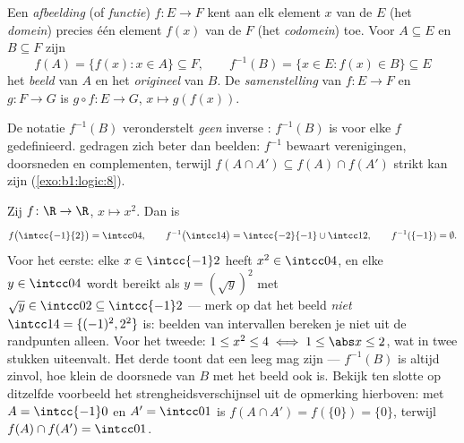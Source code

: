 \begin{definition}\label{def:b1:logic:map}
Een \emph{afbeelding} (of \emph{functie}) $f \colon E
\to F$ kent aan elk element $x$ van de  $E$ (het
\emph{domein}) precies één element $f(x)$ van de  $F$ (het
\emph{codomein}) toe. Voor $A \subseteq E$ en $B \subseteq F$ zijn
\[
f(A) = \{f(x) : x \in A\} \subseteq F,
\qquad
f^{-1}(B) = \{x \in E : f(x) \in B\} \subseteq E
\]
het \emph{beeld} van $A$ en het \emph{origineel} van
$B$. De \emph{samenstelling} van $f \colon E \to F$ en $g \colon F \to G$
is $g \circ f \colon E \to G$, $x \mapsto g(f(x))$.
\end{definition}

\begin{remark}
De notatie $f^{-1}(B)$ veronderstelt \emph{geen} inverse :
$f^{-1}(B)$ is voor elke $f$ gedefinieerd.  gedragen zich beter
dan beelden: $f^{-1}$ bewaart verenigingen, doorsneden en complementen,
terwijl $f(A \cap A') \subseteq f(A) \cap f(A')$ strikt kan zijn
(\cref{exo:b1:logic:8}).
\end{remark}

\begin{example}\label{ex:b1:logic:images}
Zij $f \colon \R \to \R$, $x \mapsto x^2$. Dan is
\[
f\bigl(\intcc{-1}{2}\bigr) = \intcc04, \qquad
f^{-1}\bigl(\intcc14\bigr) = \intcc{-2}{-1} \cup \intcc12, \qquad
f^{-1}(\{-1\}) = \emptyset .
\]
Voor het eerste: elke $x \in \intcc{-1}2$ heeft $x^2 \in \intcc04$, en
elke $y \in \intcc04$ wordt bereikt als $y = (\sqrt y)^2$ met $\sqrt y
\in \intcc02 \subseteq \intcc{-1}2$ --- merk op dat het beeld \emph{niet}
$\intcc14 = \{(-1)^2, 2^2\}$ is: beelden van intervallen bereken je niet
uit de randpunten alleen. Voor het tweede: $1 \leq x^2 \leq 4 \iff 1 \leq
\abs x \leq 2$, wat in twee stukken uiteenvalt. Het derde toont dat een
 leeg mag zijn --- $f^{-1}(B)$ is altijd zinvol, hoe klein de
doorsnede van $B$ met het beeld ook is. Bekijk ten slotte op ditzelfde
voorbeeld het strengheidsverschijnsel uit de opmerking hierboven: met $A
= \intcc{-1}0$ en $A' = \intcc01$ is $f(A \cap A') = f(\{0\}) = \{0\}$,
terwijl $f(A) \cap f(A') = \intcc01$.
\end{example}

